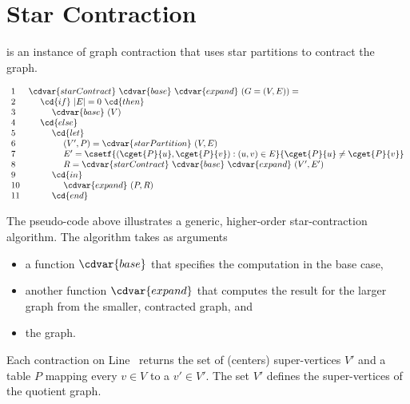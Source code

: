 \section{Star Contraction}
\label{sec:graphcon::star::contract}

\begin{definition}
 is an instance of graph contraction that uses
star partitions to contract the graph.
\end{definition}

\begin{algorithm}
\label{alg:graphcon::sc}
\[
\begin{array}{ll}
1 & \cdvar{starContract}~\cdvar{base}~\cdvar{expand}~(G = (V,E)) =
\\ 
2 & ~~~~\cd{if}~|E| = 0~\cd{then}
\\
3 & ~~~~~~~~\cdvar{base}~(V)
\\
4 & ~~~~\cd{else}
\\ 
5 & ~~~~~~~~\cd{let}
\\ 
6 & ~~~~~~~~~~~~(V',P) = \cdvar{starPartition}~(V,E)~ %
\\
7 & ~~~~~~~~~~~~E' = \csetf{(\cget{P}{u},\cget{P}{v}) : (u,v) \in  E}{\cget{P}{u} \neq \cget{P}{v}} 
\\
8 & ~~~~~~~~~~~~R = \cdvar{starContract}~\cdvar{base}~\cdvar{expand}~(V',E')
\\
9 & ~~~~~~~~\cd{in}
\\
10 & ~~~~~~~~~~~~\cdvar{expand}~(P, R)
\\
11 & ~~~~~~~~\cd{end}
\end{array}
\]

The pseudo-code above illustrates a generic, higher-order
star-contraction algorithm.
%
The algorithm takes as arguments
\begin{itemize}
\item  a function $\cdvar{base}$ that specifies
the computation in the base case,

\item 
another function $\cdvar{expand}$ that computes the result for the larger
graph from the smaller, contracted graph, and 

\item
the graph.
\end{itemize}


Each contraction on Line~\linegcscpartition{} returns the set of
(centers) super-vertices $V'$ and a table $P$ mapping every $v \in V$
to a $v' \in V'$.
%
The set $V'$ defines the super-vertices of the quotient graph.
%


\end{algorithm}
